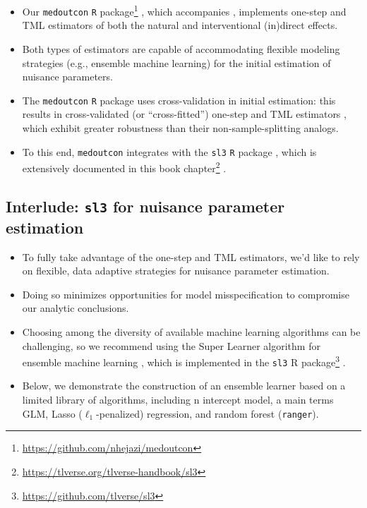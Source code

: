 \documentclass[
  12pt,
]{book}
\newcommand{\passthrough}[1]{#1}
\providecommand{\tightlist}{%
  \setlength{\itemsep}{0pt}\setlength{\parskip}{0pt}}
\renewcommand{\href}[2]{#2\footnote{\url{#1}}}
\theoremstyle{definition}
\theoremstyle{definition}
\theoremstyle{definition}
\newcommand{\1}{\mathbbm{1}}
\begin{document}
\begin{itemize}
\tightlist
\item
  Our \href{https://github.com/nhejazi/medoutcon}{\passthrough{\lstinline!medoutcon!} \passthrough{\lstinline!R!} package}
  \citep{hejazi2022medoutcon-rpkg, hejazi2022medoutcon-joss}, which accompanies
  \citet{diaz2020nonparametric}, implements one-step and TML estimators of both the
  natural and interventional (in)direct effects.
\item
  Both types of estimators are capable of accommodating flexible modeling
  strategies (e.g., ensemble machine learning) for the initial estimation of
  nuisance parameters.
\item
  The \passthrough{\lstinline!medoutcon!} \passthrough{\lstinline!R!} package uses cross-validation in initial estimation: this
  results in cross-validated (or ``cross-fitted'') one-step and TML estimators
  \citep{klaassen1987consistent, zheng2011cross, chernozhukov2018double}, which
  exhibit greater robustness than their non-sample-splitting analogs.
\item
  To this end, \passthrough{\lstinline!medoutcon!} integrates with the \passthrough{\lstinline!sl3!} \passthrough{\lstinline!R!} package \citep{coyle2022sl3},
  which is extensively documented in this \href{https://tlverse.org/tlverse-handbook/sl3}{book
  chapter} \citep{phillips2022super, vdl2022targeted}.
\end{itemize}

\hypertarget{interlude-sl3-for-nuisance-parameter-estimation}{%
\subsection{\texorpdfstring{Interlude: \texttt{sl3} for nuisance parameter estimation}{Interlude: sl3 for nuisance parameter estimation}}\label{interlude-sl3-for-nuisance-parameter-estimation}}

\begin{itemize}
\tightlist
\item
  To fully take advantage of the one-step and TML estimators, we'd like to rely
  on flexible, data adaptive strategies for nuisance parameter estimation.
\item
  Doing so minimizes opportunities for model misspecification to compromise our
  analytic conclusions.
\item
  Choosing among the diversity of available machine learning algorithms can be
  challenging, so we recommend using the Super Learner algorithm for ensemble
  machine learning \citep{vdl2007super}, which is implemented in the \href{https://github.com/tlverse/sl3}{\passthrough{\lstinline!sl3!} R
  package} \citep{coyle2022sl3}.
\item
  Below, we demonstrate the construction of an ensemble learner based on a
  limited library of algorithms, including n intercept model, a main terms GLM,
  Lasso (\(\ell_1\)-penalized) regression, and random forest (\passthrough{\lstinline!ranger!}).
\end{itemize}
\end{document}
